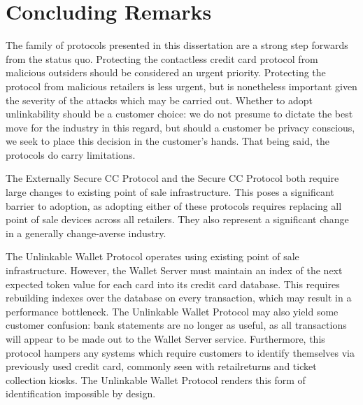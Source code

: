 \section{Concluding Remarks}

The family of protocols presented in this dissertation are a strong step forwards from the status quo.
Protecting the contactless credit card protocol from malicious outsiders should be considered an urgent priority.
Protecting the protocol from malicious retailers is less urgent, but is nonetheless important given the severity of the attacks which may be carried out.
Whether to adopt unlinkability should be a customer choice:
    we do not presume to dictate the best move for the industry in this regard, but should a customer be privacy conscious, we seek to place this decision in the customer's hands.
That being said, the protocols do carry limitations.

The Externally Secure CC Protocol and the Secure CC Protocol both require large changes to existing point of sale infrastructure.
This poses a significant barrier to adoption, as adopting either of these protocols requires replacing all point of sale devices across all retailers.
They also represent a significant change in a generally change-averse industry.

The Unlinkable Wallet Protocol operates using existing point of sale infrastructure.
However, the Wallet Server must maintain an index of the next expected token value for each card into its credit card database.
This requires rebuilding indexes over the database on every transaction, which may result in a performance bottleneck.
The Unlinkable Wallet Protocol may also yield some customer confusion:
    bank statements are no longer as useful, as all transactions will appear to be made out to the Wallet Server service.
Furthermore, this protocol hampers any systems which require customers to identify themselves via previously used credit card,
    commonly seen with retailreturns and ticket collection kiosks.
The Unlinkable Wallet Protocol renders this form of identification impossible by design.

